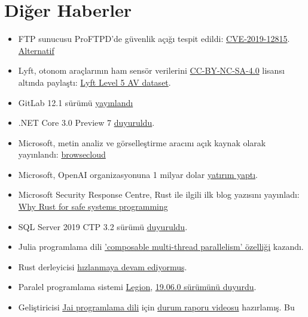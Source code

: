 \documentclass[11pt]{article}
\begin{document}
\section{Diğer Haberler}
\label{sec:orgcf70396}
\begin{itemize}
\item FTP sunucusu ProFTPD'de güvenlik açığı tespit edildi: \href{https://tbspace.de/cve201912815proftpd.html}{CVE-2019-12815}.
\href{https://nvd.nist.gov/vuln/detail/CVE-2019-12815}{Alternatif}
\item Lyft, otonom araçlarının ham sensör verilerini \href{https://creativecommons.org/licenses/by-nc-sa/4.0/}{CC-BY-NC-SA-4.0} lisansı
altında paylaştı: \href{https://level5.lyft.com/dataset/}{Lyft Level 5 AV dataset}.
\item GitLab 12.1 sürümü \href{https://about.gitlab.com/2019/07/22/gitlab-12-1-released/}{yayınlandı}
\item .NET Core 3.0 Preview 7 \href{https://devblogs.microsoft.com/dotnet/announcing-net-core-3-0-preview-7}{duyuruldu}.
\item Microsoft, metin analiz ve görselleştirme aracını açık kaynak olarak
yayınlandı: \href{https://github.com/microsoft/browsecloud}{browsecloud}
\item Microsoft, OpenAI organizasyonuna 1 milyar dolar \href{https://openai.com/blog/microsoft/}{yatırım yaptı}.
\item Microsoft Security Response Centre, Rust ile ilgili ilk blog yazısını
yayınladı: \href{https://msrc-blog.microsoft.com/2019/07/22/why-rust-for-safe-systems-programming/}{Why Rust for safe systems programming}
\item SQL Server 2019 CTP 3.2 sürümü \href{https://cloudblogs.microsoft.com/sqlserver/2019/07/24/sql-server-2019-community-technology-preview-3-2-is-now-available/}{duyuruldu}.
\item Julia programlama dili \href{https://julialang.org/blog/2019/07/multithreading}{'composable multi-thread parallelism' özelliği} kazandı.
\item Rust derleyicisi \href{https://blog.mozilla.org/nnethercote/2019/07/25/the-rust-compiler-is-still-getting-faster/}{hızlanmaya devam ediyormuş}.
\item Paralel programlama sistemi \href{https://legion.stanford.edu/overview/}{Legion}, \href{https://github.com/StanfordLegion/legion/releases/tag/legion-19.06.0}{19.06.0 sürümünü duyurdu}.
\item Geliştiricisi \href{https://inductive.no/jai/}{Jai programlama dili} için \href{https://www.youtube.com/watch?v=4\_ODvZ01CjU}{durum raporu videosu} hazırlamış. Bu

\end{itemize}
\end{document}
